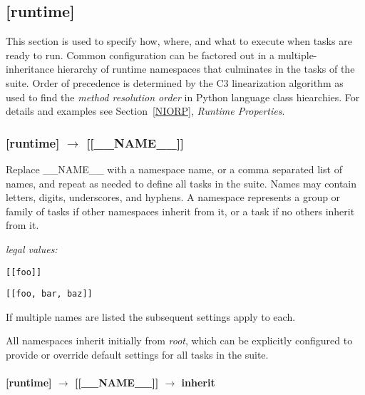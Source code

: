 \subsection{[runtime]}

This section is used to specify how, where, and what to execute when
tasks are ready to run. Common
configuration can be factored out in a multiple-inheritance hierarchy of
runtime namespaces that culminates in the tasks of the suite. Order of
precedence is determined by the C3 linearization algorithm as used to
find the {\em method resolution order} in Python language class
hiearchies. For details and examples see Section~\ref{NIORP}, {\em
Runtime Properties}.

\subsubsection[{[[}\_\_NAME\_\_{]]}]{[runtime] $\rightarrow$ [[\_\_NAME\_\_]]}

Replace \_\_NAME\_\_ with a namespace name, or a comma separated list of
names, and repeat as needed to define all tasks in the suite. Names may
contain letters, digits, underscores, and hyphens. A namespace
represents a group or family of tasks if other namespaces inherit from
it, or a task if no others inherit from it.


\begin{myitemize}
\item {\em legal values:}
    \begin{myitemize}
        \item \lstinline=[[foo]]=
        \item \lstinline=[[foo, bar, baz]]=
    \end{myitemize}
\end{myitemize}

If multiple names are listed the subsequent settings apply to each.

All namespaces inherit initially from {\em root}, which can be
explicitly configured to provide or override default settings
for all tasks in the suite.

\paragraph[inherit]{[runtime] $\rightarrow$ [[\_\_NAME\_\_]] $\rightarrow$ inherit}

